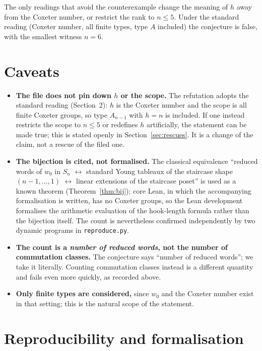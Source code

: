 \documentclass[11pt]{article}
\theoremstyle{definition}
\theoremstyle{remark}
\begin{document}
The only readings that avoid the counterexample change the meaning of $h$
away from the Coxeter number, or restrict the rank to $n \le 5$. Under the
standard reading (Coxeter number, all finite types, type $A$ included) the
conjecture is false, with the smallest witness $n = 6$.

\section{Caveats}

\begin{itemize}
\item \textbf{The file does not pin down $h$ or the scope.} The refutation
  adopts the standard reading (Section~2): $h$ is the Coxeter number and the
  scope is all finite Coxeter groups, so type $A_{n-1}$ with $h = n$ is
  included. If one instead restricts the scope to $n \le 5$ or redefines $h$
  artificially, the statement can be made true; this is stated openly in
  Section~\ref{sec:rescues}. It is a change of the claim, not a rescue of the
  filed one.
\item \textbf{The bijection is cited, not formalised.} The classical
  equivalence ``reduced words of $w_0$ in $S_n$ $\leftrightarrow$ standard
  Young tableaux of the staircase shape $(n-1,\dots,1)$
  $\leftrightarrow$ linear extensions of the staircase poset'' is used as a
  known theorem (Theorem~\ref{thm:bij}); core Lean, in which the accompanying
  formalisation is written, has no Coxeter groups, so the Lean development
  formalises the arithmetic evaluation of the hook-length formula rather than
  the bijection itself. The count is nevertheless confirmed independently by
  two dynamic programs in \texttt{reproduce.py}.
\item \textbf{The count is a \emph{number of reduced words}, not the number of
  commutation classes.} The conjecture says ``number of reduced words''; we
  take it literally. Counting commutation classes instead is a different
  quantity and fails even more quickly, as recorded above.
\item \textbf{Only finite types are considered,} since $w_0$ and the Coxeter
  number exist in that setting; this is the natural scope of the statement.
\end{itemize}

\section{Reproducibility and formalisation}
\end{document}

